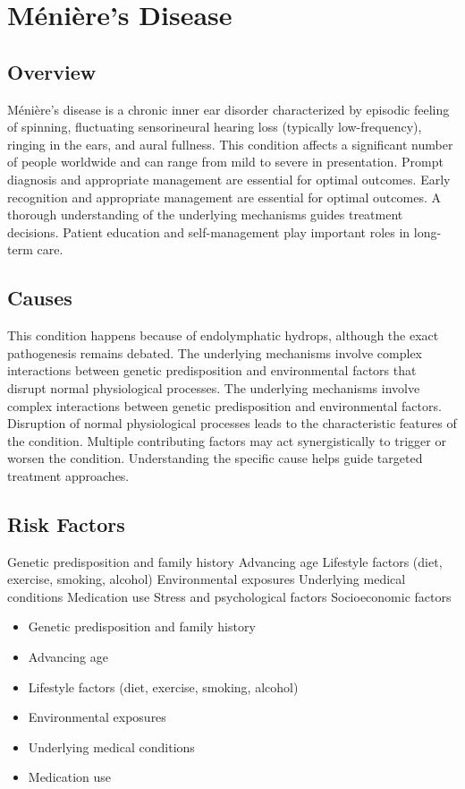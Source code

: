 \chapter{Ménière's Disease}
\label{sec:Ménière's Disease}

\section{Overview}
Ménière's disease is a chronic inner ear disorder characterized by episodic feeling of spinning, fluctuating sensorineural hearing loss (typically low-frequency), ringing in the ears, and aural fullness. This condition affects a significant number of people worldwide and can range from mild to severe in presentation. Prompt diagnosis and appropriate management are essential for optimal outcomes. Early recognition and appropriate management are essential for optimal outcomes. A thorough understanding of the underlying mechanisms guides treatment decisions. Patient education and self-management play important roles in long-term care.
\section{Causes}
This condition happens because of endolymphatic hydrops, although the exact pathogenesis remains debated. The underlying mechanisms involve complex interactions between genetic predisposition and environmental factors that disrupt normal physiological processes. The underlying mechanisms involve complex interactions between genetic predisposition and environmental factors. Disruption of normal physiological processes leads to the characteristic features of the condition. Multiple contributing factors may act synergistically to trigger or worsen the condition. Understanding the specific cause helps guide targeted treatment approaches.
\section{Risk Factors}
Genetic predisposition and family history Advancing age Lifestyle factors (diet, exercise, smoking, alcohol) Environmental exposures Underlying medical conditions Medication use Stress and psychological factors Socioeconomic factors

\begin{itemize}[noitemsep]
  \item Genetic predisposition and family history
  \item Advancing age
  \item Lifestyle factors (diet, exercise, smoking, alcohol)
  \item Environmental exposures
  \item Underlying medical conditions
  \item Medication use
\end{itemize}
